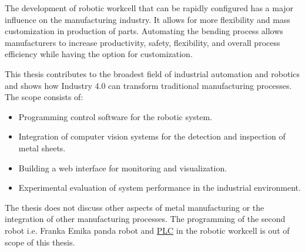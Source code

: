 The development of robotic workcell that can be rapidly configured has a major influence on the manufacturing industry. It allows for more flexibility and mass customization in production of parts. \cite{CHEN2001199} Automating the bending process allows manufacturers to increase productivity, safety, flexibility, and overall process efficiency while having the option for customization. \cite[page 9]{russmann2015industry} 

This thesis contributes to the broadest field of industrial automation and robotics and shows how Industry 4.0 can transform traditional manufacturing processes.
The scope consists of:
\begin{itemize}
    \item Programming control software for the robotic system. 
    \item Integration of computer vision systems for the detection and inspection of metal sheets.
    \item Building a web interface for monitoring and visualization.
    \item Experimental evaluation of system performance in the industrial environment. 
\end{itemize}

The thesis does not discuss other aspects of metal manufacturing or the integration of other manufacturing processes.
The programming of the second robot i.e. Franka Emika panda robot and \hyperref[acro:PLC]{PLC} in the robotic workcell is out of scope of this thesis.